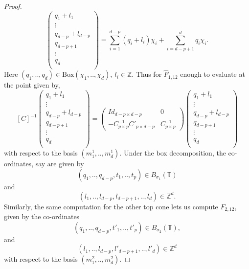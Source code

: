 \documentclass[10pt,a4paper]{amsart}
\begin{document}
\begin{proof}
$$\begin{pmatrix}
  q_1+l_1 \\
  \vdots \\
  q_{d-p}+l_{d-p} \\
  q_{d-p+1} \\
  \vdots \\
  q_{d} \\
\end{pmatrix}=\sum_{i=1}^{d-p}(q_i+l_i)\chi_i+\sum_{i=d-p+1}^{d}q_i\chi_i.$$ Here $(q_1,..,q_d)\in \text{Box}(\chi_1,..,\chi_d),\ l_i\in \mathbb{Z}.$\newline
Thus for $\hat{F}_{1,12}$ enough to evaluate at the point given by,
$$[C]^{-1}\begin{pmatrix}
  q_1+l_1 \\
  \vdots \\
  q_{d-p}+l_{d-p} \\
  q_{d-p+1} \\
  \vdots \\
  q_{d} \\
\end{pmatrix}=\left(\begin{array}{cc} Id_{d-p \times d-p} & 0\\ -C^{-1}_{p\times p}C'_{p\times d-p} & C^{-1}_{p\times p} \end{array}\right)\begin{pmatrix}
  q_1+l_1 \\
  \vdots \\
  q_{d-p}+l_{d-p} \\
  q_{d-p+1} \\
  \vdots \\
  q_{d} \\
\end{pmatrix}$$ with respect to the basis $(m^1_1,..,m^1_d).$ \newline 
Under the box decomposition, the co-ordinates, say are given by $$(q_1,..,q_{d-p},t_{1},..,t_p)\in B_{\sigma_1}(\mathbb{T})$$ and $$(l_1,..,l_{d-p},l_{d-p+1},..,l_d)\in \mathbb{Z}^d.$$
Similarly, the same computation for the other top cone lets us compute $\hat{F}_{2,12}$, given by the co-ordinates
$$(q_1,..,q_{d-p},t'_1,..,t'_p)\in B_{\sigma_2}(\mathbb{T}),$$ and $$(l_1,..,l_{d-p},l'_{d-p+1},..,l'_{d})\in \mathbb{Z}^d$$ with respect to the basis $(m^2_1,..,m^2_d).$\par 

\end{proof}
\end{document}
